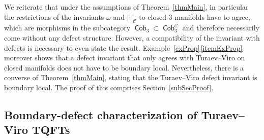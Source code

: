 \documentclass[pdftex]{sigma}
\DeclareMathOperator{\Cob}{\mathsf{Cob}}
\DeclareMathOperator{\calc}{\mathcal{C}}
\numberwithin{equation}{section}
\theoremstyle{definition}
\begin{document}
We reiterate that under the assumptions of Theorem~\ref{thmMain}, in particular the restrictions of the invariants $\omega$ and $| \cdot |_{\calc}$ to closed 3-manifolds have to agree, which are morphisms in the subcategory $\Cob_3 \subset \Cob_3^{\calc}$ and therefore necessarily come without any defect structure. However, a compatibility of the invariant with defects is necessary to even state the result. Example~\ref{exProp}\,\ref{itemExProp} moreover shows that a defect invariant that only agrees with Turaev--Viro on closed manifolds does not have to be boundary local. Nevertheless, there is a converse of Theorem~\ref{thmMain}, stating that the Turaev--Viro defect invariant is boundary local. The proof of this comprises Section~\ref{subSecProof}.

\subsection{Boundary-defect characterization of Turaev--Viro TQFTs}
\end{document}
